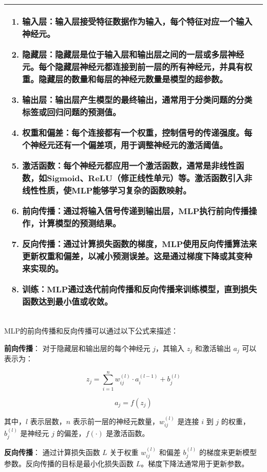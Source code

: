 \documentclass[bwprint]{gmcmthesis}
\begin{document}
				\begin{table}[H]
					\centering
					\begin{tabularx}{\textwidth}{|X|}
					\hline
					\begin{enumerate}
						\item \textbf{输入层}：输入层接受特征数据作为输入，每个特征对应一个输入神经元。
						\item \textbf{隐藏层}：隐藏层是位于输入层和输出层之间的一层或多层神经元。每个隐藏层神经元都连接到前一层的所有神经元，并具有权重。隐藏层的数量和每层的神经元数量是模型的超参数。
						\item \textbf{输出层}：输出层产生模型的最终输出，通常用于分类问题的分类标签或回归问题的预测值。
						\item \textbf{权重和偏差}：每个连接都有一个权重，控制信号的传递强度。每个神经元还有一个偏差项，用于调整神经元的激活阈值。
						\item \textbf{激活函数}：每个神经元都应用一个激活函数，通常是非线性函数，如Sigmoid、ReLU（修正线性单元）等。激活函数引入非线性性质，使MLP能够学习复杂的函数映射。
						\item \textbf{前向传播}：通过将输入信号传递到输出层，MLP执行前向传播操作，计算模型的预测结果。
						\item \textbf{反向传播}：通过计算损失函数的梯度，MLP使用反向传播算法来更新权重和偏差，以减小预测误差。这是通过梯度下降或其变种来实现的。
						\item \textbf{训练}：MLP通过迭代前向传播和反向传播来训练模型，直到损失函数达到最小值或收敛。
					\end{enumerate}\\
					\hline
				\end{tabularx}
				\end{table}
				
				MLP的前向传播和反向传播可以通过以下公式来描述：
				
				\textbf{前向传播}：
				对于隐藏层和输出层的每个神经元 $j$，其输入 $z_j$ 和激活输出 $a_j$ 可以表示为：
				
				\[
				z_j = \sum_{i=1}^{n} w_{ij}^{(l)} \cdot a_i^{(l-1)} + b_j^{(l)}
				\]
				
				\[
				a_j = f(z_j)
				\]
				
				其中，$l$ 表示层数，$n$ 表示前一层的神经元数量，$w_{ij}^{(l)}$ 是连接 $i$ 到 $j$ 的权重，$b_j^{(l)}$ 是神经元 $j$ 的偏差，$f(\cdot)$ 是激活函数。
				
				\textbf{反向传播}：
				通过计算损失函数 $L$ 关于权重 $w_{ij}^{(l)}$ 和偏差 $b_j^{(l)}$ 的梯度来更新模型参数。反向传播的目标是最小化损失函数 $L$。梯度下降法通常用于更新参数。
				
\end{document}
